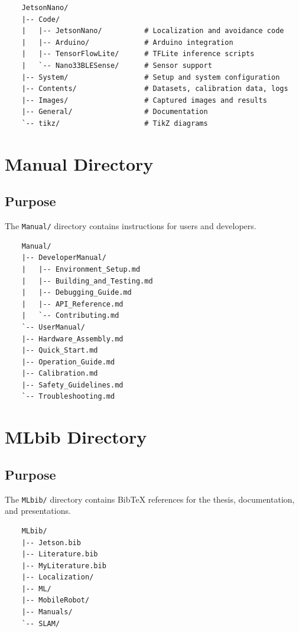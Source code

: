 \begin{verbatim}
	JetsonNano/
	|-- Code/
	|   |-- JetsonNano/          # Localization and avoidance code
	|   |-- Arduino/             # Arduino integration
	|   |-- TensorFlowLite/      # TFLite inference scripts
	|   `-- Nano33BLESense/      # Sensor support
	|-- System/                  # Setup and system configuration
	|-- Contents/                # Datasets, calibration data, logs
	|-- Images/                  # Captured images and results
	|-- General/                 # Documentation
	`-- tikz/                    # TikZ diagrams
\end{verbatim}

\section{Manual Directory}

\subsection{Purpose}

The \texttt{Manual/} directory contains instructions for users and developers.

\begin{verbatim}
	Manual/
	|-- DeveloperManual/
	|   |-- Environment_Setup.md
	|   |-- Building_and_Testing.md
	|   |-- Debugging_Guide.md
	|   |-- API_Reference.md
	|   `-- Contributing.md
	`-- UserManual/
	|-- Hardware_Assembly.md
	|-- Quick_Start.md
	|-- Operation_Guide.md
	|-- Calibration.md
	|-- Safety_Guidelines.md
	`-- Troubleshooting.md
\end{verbatim}

\section{MLbib Directory}

\subsection{Purpose}

The \texttt{MLbib/} directory contains Bib\TeX{} references for the thesis, documentation, and presentations.

\begin{verbatim}
	MLbib/
	|-- Jetson.bib
	|-- Literature.bib
	|-- MyLiterature.bib
	|-- Localization/
	|-- ML/
	|-- MobileRobot/
	|-- Manuals/
	`-- SLAM/
\end{verbatim}

